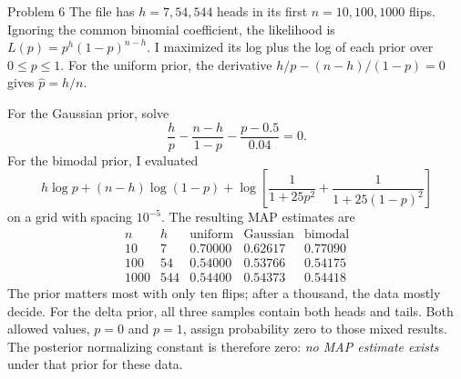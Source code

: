 \documentclass[12pt,a4paper]{article}
\begin{document}
\begin{solution}{Problem 6}
The file has $h=7,54,544$ heads in its first $n=10,100,1000$ flips.
Ignoring the common binomial coefficient, the likelihood is
$L(p)=p^h(1-p)^{n-h}$. I maximized its log plus the log of each prior
over $0\leq p\leq1$. For the uniform prior, the derivative
$h/p-(n-h)/(1-p)=0$ gives $\widehat p=h/n$.

For the Gaussian prior, solve
\[
 \frac hp-\frac{n-h}{1-p}-\frac{p-0.5}{0.04}=0.
\]
For the bimodal prior, I evaluated
\[
 h\log p+(n-h)\log(1-p)
 +\log\!\left[\frac1{1+25p^2}+\frac1{1+25(1-p)^2}\right]
\]
on a grid with spacing $10^{-5}$. The resulting MAP estimates are
\[
\begin{array}{c|r|rrr}
n&h&\text{uniform}&\text{Gaussian}&\text{bimodal}\\\hline
10&7&0.70000&0.62617&0.77090\\
100&54&0.54000&0.53766&0.54175\\
1000&544&0.54400&0.54373&0.54418
\end{array}
\]
The prior matters most with only ten flips; after a thousand, the data
mostly decide. For the delta prior, all three samples contain both heads
and tails. Both allowed values, $p=0$ and $p=1$, assign probability zero
to those mixed results. The posterior normalizing constant is therefore
zero: \emph{no MAP estimate exists} under that prior for these data.
\end{solution}
\end{document}
